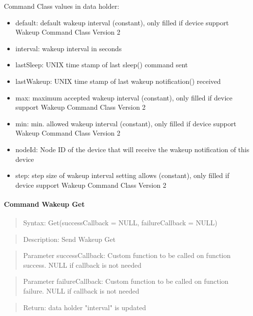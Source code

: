 Command Class values in data holder:
\begin{itemize}
\item default: default wakeup interval (constant), only filled if device support Wakeup Command Class Version 2
\item interval:  wakeup interval in seconds
\item lastSleep: UNIX time stamp of last sleep() command sent
\item lastWakeup:  UNIX time stamp of last wakeup notification() received
\item max: maximum accepted wakeup interval (constant), only filled if device support Wakeup Command Class Version 2
\item min: min. allowed wakeup interval (constant), only filled if device support Wakeup Command Class Version 2
\item nodeId: Node ID of the device that will receive the wakeup notification of this device
\item step: step size of wakeup interval setting allows (constant), only filled if device support Wakeup Command Class Version 2
\end{itemize}

\paragraph {Command Wakeup Get}
\begin{quote} Syntax: Get(successCallback = NULL, failureCallback = NULL)\end{quote}
\begin{quote} Description: Send Wakeup Get\end{quote}
\begin{quote} Parameter successCallback: Custom function to be called on function success. NULL if callback is not needed\end{quote}
\begin{quote} Parameter failureCallback: Custom function to be called on function failure. NULL if callback is not needed\end{quote}
\begin{quote} Return: data holder "interval" is updated\end{quote}

 
